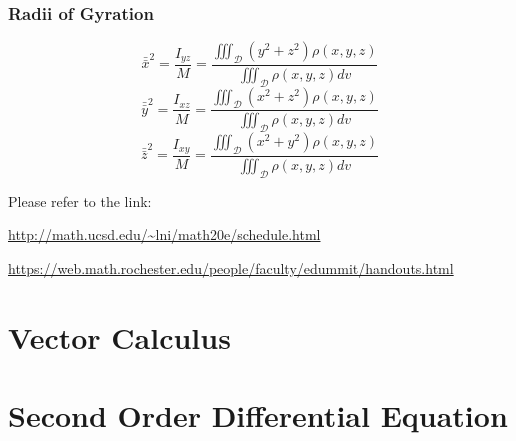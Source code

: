 \documentclass[UTF8,a4paper, 10pt, openany]{svmono}
\begin{document}
\subsection{Radii of Gyration}
$$\bar{\bar{x}}^2=\dfrac{I_{yz}}{M}=\dfrac{\displaystyle\iiint_{\mathcal{D}}(y^2+z^2)\rho(x,y,z)}{\displaystyle\iiint_{\mathcal{D}}\rho (x,y,z)dv}$$
$$\bar{\bar{y}}^2=\dfrac{I_{xz}}{M}=\dfrac{\displaystyle\iiint_{\mathcal{D}}(x^2+z^2)\rho(x,y,z)}{\displaystyle\iiint_{\mathcal{D}}\rho (x,y,z)dv}$$
$$\bar{\bar{z}}^2=\dfrac{I_{xy}}{M}=\dfrac{\displaystyle\iiint_{\mathcal{D}}(x^2+y^2)\rho(x,y,z)}{\displaystyle\iiint_{\mathcal{D}}\rho (x,y,z)dv}$$

Please refer to the link:

\url{http://math.ucsd.edu/~lni/math20e/schedule.html}

\url{https://web.math.rochester.edu/people/faculty/edummit/handouts.html}

\chapter{Vector Calculus}
\chapter{Second Order Differential Equation}

\appendix %

\printnotes*
\end{document}
